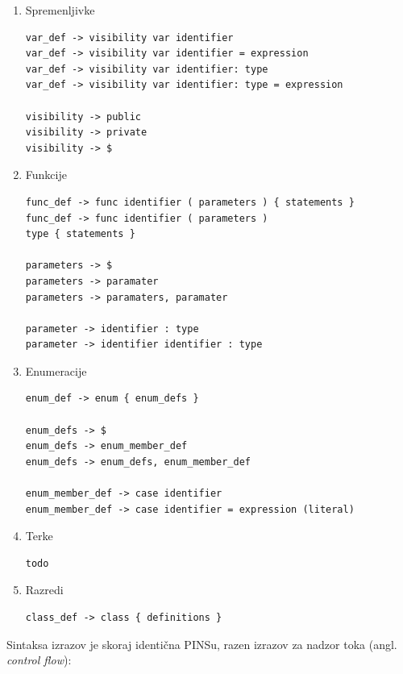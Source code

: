 \documentclass[a4paper, 12p]{book}
\begin{document}
\begin{enumerate}
	\item Spremenljivke
\begin{lstlisting}[]
var_def -> visibility var identifier 
var_def -> visibility var identifier = expression
var_def -> visibility var identifier: type 
var_def -> visibility var identifier: type = expression 

visibility -> public
visibility -> private
visibility -> $
\end{lstlisting}
	\item Funkcije
\begin{lstlisting}[]
func_def -> func identifier ( parameters ) { statements }
func_def -> func identifier ( parameters ) 
type { statements }

parameters -> $
parameters -> paramater
parameters -> paramaters, paramater

parameter -> identifier : type
parameter -> identifier identifier : type
\end{lstlisting}	
	\item Enumeracije
	
\begin{lstlisting}
enum_def -> enum { enum_defs }

enum_defs -> $
enum_defs -> enum_member_def
enum_defs -> enum_defs, enum_member_def

enum_member_def -> case identifier
enum_member_def -> case identifier = expression (literal)
\end{lstlisting}
	\item Terke
\begin{lstlisting}
todo
\end{lstlisting}
	\item Razredi
\begin{lstlisting}
class_def -> class { definitions }
\end{lstlisting}

\end{enumerate} 

Sintaksa izrazov je skoraj identična PINSu, razen izrazov za nadzor toka (angl. \textit{control flow}):
\end{document}
